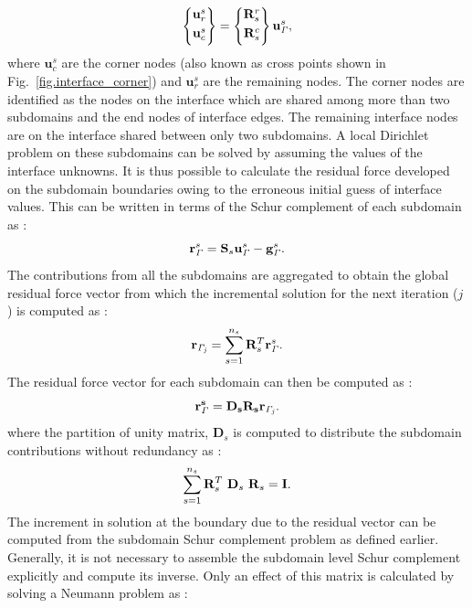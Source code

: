 \documentclass{article}
\begin{document}
\begin{equation}\label{eq:uruc}
\begin{Bmatrix}
     {{\mathbf{u}^s_r}}
\\[0.3em]
     {{\mathbf{u}^s_c}}
\\[0.3em]
\end{Bmatrix}  =
\begin{Bmatrix}
     {{\mathbf{R}_s^r}}
\\[0.3em]
     {{\mathbf{R}_s^c}}
\\[0.3em]
\end{Bmatrix}
\mathbf{u}^s_{\it\Gamma},
\end{equation}
where $\mathbf{u}^s_c$ are the corner nodes (also known as cross points shown in Fig.~\ref{fig.interface_corner}) and $\mathbf{u}^s_r$ are the remaining nodes. The corner nodes are identified as the nodes on the interface which are shared among more than two subdomains and the end nodes of interface edges. The remaining interface nodes are on the interface shared between only two subdomains. A local Dirichlet problem on these subdomains can be solved by assuming the values of the interface unknowns. It is thus possible to calculate the residual force developed on the subdomain boundaries owing to the erroneous initial guess of interface values. This can be written in terms of the Schur complement of each subdomain as \cite{subber_thesis}:
\begin{equation}
\mathbf{r}_{\it{\Gamma}} ^s = \mathbf{S}_s \mathbf{u}_{\it{\Gamma}} ^s - \mathbf{g}_{\it{\Gamma}}^s.
\end{equation}
The contributions from all the subdomains are aggregated to obtain the global residual force vector from which the incremental solution for the next iteration ($j$) is computed as \cite{subber_thesis}:
\begin{equation}
\mathbf{r}_{\it{\Gamma}_j} = \sum_{s=1}^{n_s} \mathbf{R}^T_s \mathbf{r}_{\it{\Gamma}} ^s.
\end{equation}
The residual force vector for each subdomain can then be computed as \cite{subber_thesis}:
\begin{equation}
\bf{r}_{\it{\Gamma}} ^s = {\bf D}_{s} {\bf{R}}_{s} \bf{r}_{\it{\Gamma}_j}.
\end{equation}
where the partition of unity matrix, $\mathbf{D}_s$ is computed to distribute the subdomain contributions without redundancy as \cite{book_DD_tarek}:
\begin{equation}\label{Eq.det_scaling}
\sum_{s=1}^{n_s} {\bf{R}}^T_{s} \ {\bf D}_{s} \ {\bf{R}}_{s} = {\bf{I}}.
\end{equation}
The increment in solution at the boundary due to the residual vector can be computed from the subdomain Schur complement problem as defined earlier. Generally, it is not necessary to assemble the subdomain level Schur complement explicitly and compute its inverse. Only an effect of this matrix is calculated by solving a Neumann problem as \cite{subber_thesis}:
\end{document}
